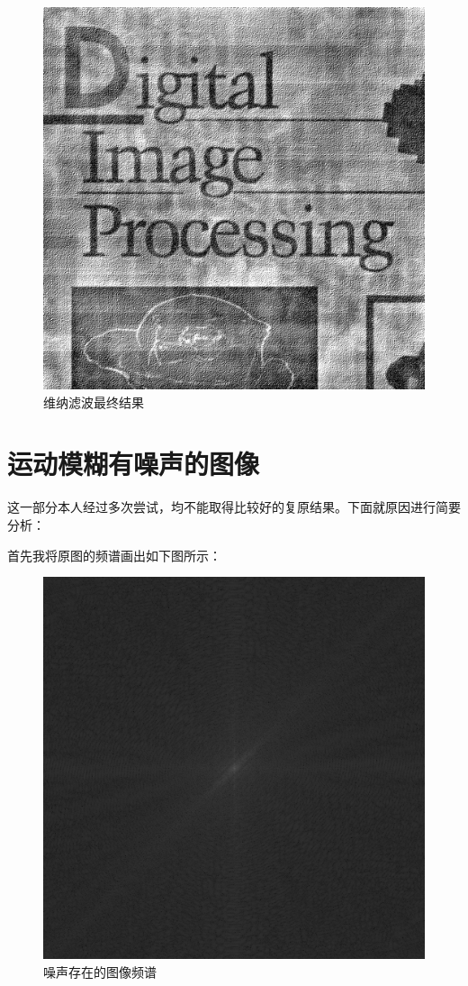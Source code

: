 \documentclass{article}
\begin{document}
		\begin{figure}[H]
			\centering
			\includegraphics[scale = 0.5]{result2.png}
			\caption{维纳滤波最终结果}
		\end{figure}
	\section{运动模糊有噪声的图像}
	
	这一部分本人经过多次尝试，均不能取得比较好的复原结果。下面就原因进行简要分析：
	
	首先我将原图的频谱画出如下图所示：
	\begin{figure}[H]
		\centering
		\includegraphics[scale = 0.5]{noise_fft.png}
		\caption{噪声存在的图像频谱}
	\end{figure}
	
\end{document}
